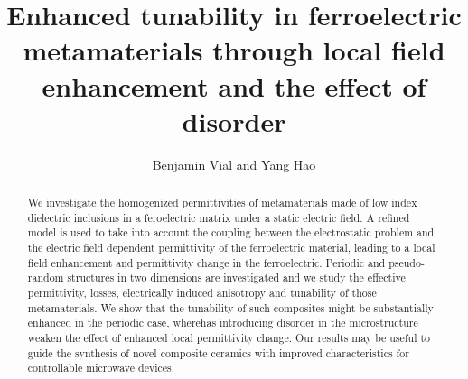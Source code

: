 \documentclass[%
 aip,
 amsmath,amssymb,
 reprint,%
]{revtex4-1}
\begin{document}
\title{Enhanced tunability in ferroelectric metamaterials through local field enhancement and the effect of disorder}
\author{Benjamin Vial and Yang Hao}


%
%


%


\begin{abstract}
 We investigate the homogenized permittivities of metamaterials made of low index dielectric inclusions
 in a feroelectric matrix under
 a static electric field. A refined model is used to take into account the coupling
 between the electrostatic problem and the electric field dependent permittivity of the
 ferroelectric material, leading to a local field enhancement and permittivity change in the ferroelectric.
 Periodic and pseudo-random structures in two dimensions are investigated and
 we study the effective permittivity, losses, electrically induced anisotropy and tunability
 of those metamaterials. We show that the tunability of such composites might be substantially
 enhanced in the periodic case, wherehas introducing disorder in the microstructure
 weaken the effect of enhanced local permittivity change. Our results may be useful to guide the synthesis of novel
 composite ceramics with improved characteristics for controllable microwave devices.
\end{abstract}

\maketitle
\end{document}
